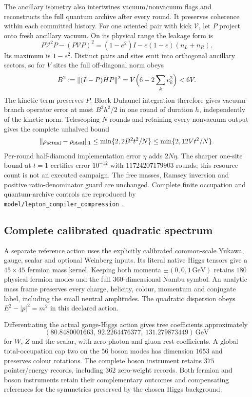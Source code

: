 The ancillary isometry also intertwines vacuum/nonvacuum flags and
reconstructs the full quantum archive after every round. It preserves
coherence within each committed history. For one oriented pair with kick
$\mathcal V$, let $P$ project onto fresh ancillary vacuum. On its physical
range the leakage form is
\[
 P\mathcal V^2P-(P\mathcal VP)^2
 =(1-e^2)I-e(1-e)(n_L+n_R).
\]
Its maximum is $1-e^2$. Distinct pairs and sites emit into orthogonal
ancillary sectors, so for $V$ sites the full off-diagonal norm obeys
\[
 B^2:=\|(I-P)HP\|^2=V\Bigl(6-2\sum_k e_k^2\Bigr)<6V.
\]
The kinetic term preserves $P$. Block Duhamel integration therefore
gives vacuum-branch operator error at most $B^2h^2/2$ in one round of
duration $h$, independently of the kinetic norm. Telescoping $N$ rounds
and retaining every nonvacuum output gives the complete unhalved bound
\[
 \|\rho_{\rm actual}-\rho_{\rm ideal}\|_1
 \le \min\{2,2B^2t^2/N\}\le\min\{2,12Vt^2/N\}.
\]
Per-round half-diamond implementation error $\eta$ adds $2N\eta$.
The sharper one-site bound at $t=1$ certifies error $10^{-12}$ with
$11724207179903$ rounds; this resource count is not an executed campaign.
The free masses, Ramsey inversion and positive ratio-denominator guard
are unchanged. Complete finite occupation and quantum-archive controls
are reproduced by \texttt{model/lepton\_compiler\_compression}
\cite{ophrepo}.

\subsection{Complete calibrated quadratic spectrum}

A separate reference action uses the explicitly calibrated common-scale
Yukawa, gauge, scalar and optional Weinberg inputs. Its literal native
Higgs tensors give a $45\times45$ fermion mass kernel. Keeping both
momenta $\pm(0,0,1\,\mathrm{GeV})$ retains $180$ physical fermion
modes and the full $360$-dimensional Nambu symbol. An analytic mass frame
preserves every charge, helicity, colour, momentum and conjugate label,
including the small neutral amplitudes. The quadratic dispersion obeys
$E^2-|p|^2=m^2$ in this declared action.

Differentiating the actual gauge-Higgs action gives tree coefficients
approximately
\[
 (80.8480001663,\ 92.2264476377,\ 131.279873449)\,\mathrm{GeV}
\]
for $W$, $Z$ and the scalar, with zero
photon and gluon rest coefficients. A global total-occupation cap two
on the $56$ boson modes has dimension $1653$ and preserves colour
rotations. The complete boson instrument retains $375$ pointer/energy
records, including $362$ zero-weight records. Both fermion and boson
instruments retain their complementary outcomes and compensating
references for the symmetries preserved by the chosen Higgs background.

